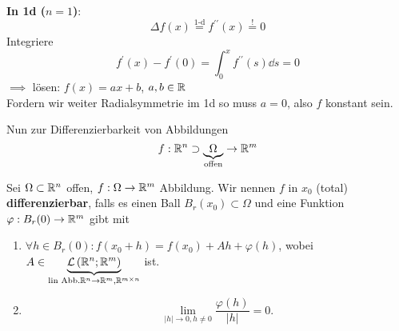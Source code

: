 \textbf{In 1d ($ n = 1 $)}:
\[
	\Delta f(x) \overset{\text{1-d} }{=} f^{\prime\prime} (x) \overset{!}{=} 0
\]
Integriere
\[
	f^\prime (x) - f^\prime (0) = \int_{0}^{x} f^{\prime\prime} (s) \dd s = 0
\]
$ \implies  $ lösen: $ f(x) = ax + b $, $ a, b \in \mathbb{R}  $\\
Fordern wir weiter Radialsymmetrie im 1d so muss $ a = 0 $, also $ f $ konstant sein.

Nun zur Differenzierbarkeit von Abbildungen
\[
	f : \mathbb{R} ^n \supset \underbrace{\Omega}_{\text{offen} } \to \mathbb{R} ^m
\]

\begin{definition}
	Sei $ \Omega \subset \mathbb{R} ^n $ offen, $ f : \Omega \to \mathbb{R} ^m $ Abbildung.
	Wir nennen $ f $ in $ x_0 $ (total) \textbf{differenzierbar}, falls es einen Ball $ B_{r}(x_0) \subset \Omega $ und eine Funktion
	$ \varphi : B_{r}(0) \to \mathbb{R} ^m $ gibt mit
	\begin{enumerate}[label=(\roman*)]
		\item $ \forall h \in B_{r}(0) : f(x_0 + h) = f(x_0) + Ah + \varphi(h) $, wobei $ A \in \underbrace{ \mathcal{L} \left( \mathbb{R} ^n; \mathbb{R} ^m \right) }_{\text{lin Abb.} \mathbb{R} ^n \to \mathbb{R} ^m, \mathbb{R} ^{m \times n}}  $ ist.
		\item
			\[
				\lim_{\left| h \right|  \to 0, h \neq 0} \frac{ \varphi (h ) }{ \left| h \right|  } = 0.
			\]
			
	\end{enumerate}
	
\end{definition}

